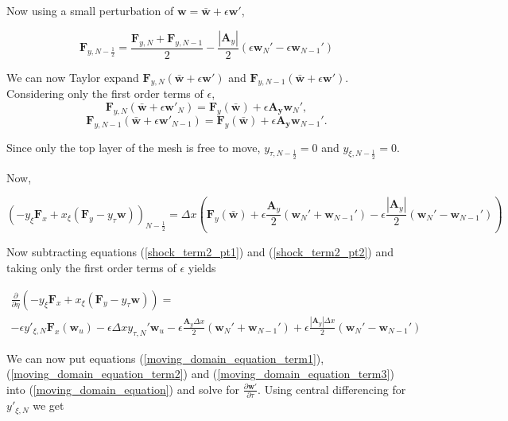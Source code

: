 \documentclass[10pt]{article}
\begin{document}
	Now using a small perturbation of $\mathbf{w} = \bar{\mathbf{w}} + \epsilon \mathbf{w}'$, 
	
	$$ \mathbf{F}_{y,N-\frac{1}{2}} = \frac{\mathbf{F}_{y,N} + \mathbf{F}_{y,N-1}}{2} - \frac{|\mathbf{A}_y|}{2} (\epsilon \mathbf{w}_{N}' - \epsilon \mathbf{w}_{N-1}')$$
	
	We can now Taylor expand $\mathbf{F}_{y,N}(\bar{\mathbf{w}} + \epsilon \mathbf{w}')$ and $\mathbf{F}_{y,N-1}(\bar{\mathbf{w}} + \epsilon \mathbf{w}')$. Considering only the first order terms of $\epsilon$,
	$$ \mathbf{F}_{y,N}(\bar{\mathbf{w}} + \epsilon \mathbf{w}'_{N}) = \mathbf{F}_{y}(\bar{\mathbf{w}}) + \epsilon \mathbf{A_y} \mathbf{w}_{N}', $$
	$$ \mathbf{F}_{y,N-1}(\bar{\mathbf{w}} + \epsilon \mathbf{w}'_{N-1}) = \mathbf{F}_{y}(\bar{\mathbf{w}}) + \epsilon \mathbf{A_y} \mathbf{w}_{N-1}'. $$
	
	Since only the top layer of the mesh is free to move, $y_{\tau,N-\frac{1}{2}}=0$ and $y_{\xi,N-\frac{1}{2}}=0$.
	
	Now,
	
	\begin{equation} \label{shock_term2_pt2}
		(-y_\xi \mathbf{F}_x + x_\xi (\mathbf{F}_y - y_\tau \mathbf{w}))_{N-\frac{1}{2}} 
		= \Delta x \left( \mathbf{F}_{y}(\bar{\mathbf{w}}) + \epsilon \frac{\mathbf{A}_y}{2} \left( \mathbf{w}_{N}' + \mathbf{w}_{N-1}' \right) - \epsilon \frac{|\mathbf{A}_y|}{2} \left( \mathbf{w}_N' - \mathbf{w}_{N-1}' \right) \right)
	\end{equation}
	
	Now subtracting  equations (\ref{shock_term2_pt1}) and (\ref{shock_term2_pt2}) and taking only the first order terms of $\epsilon$ yields
	
	\begin{multline} \label{moving_domain_equation_term3}
		\frac{\partial}{\partial \eta} (-y_\xi \mathbf{F}_x + x_\xi (\mathbf{F}_y - y_\tau \mathbf{w})) = 
		\\- \epsilon y'_{\xi,N} \mathbf{F}_{x}(\mathbf{w}_u)
		- \epsilon \Delta x y_{\tau,N}' \mathbf{w}_u
		- \epsilon \frac{\mathbf{A}_y \Delta x}{2} \left( \mathbf{w}_{N}' + \mathbf{w}_{N-1}' \right) 
		+ \epsilon \frac{|\mathbf{A}_y| \Delta x}{2} ( \mathbf{w}_N' - \mathbf{w}_{N-1}')
	\end{multline}
	
	We can now put equations (\ref{moving_domain_equation_term1}), (\ref{moving_domain_equation_term2}) and (\ref{moving_domain_equation_term3}) into (\ref{moving_domain_equation}) and solve for $\frac{\partial \mathbf{w}'}{\partial \tau}$. Using central differencing for $y'_{\xi,N}$ we get
		
\end{document}
